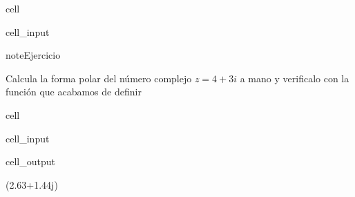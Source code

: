 \documentclass[letterpaper,10pt,english]{jupyterBook}
\begin{document}
\begin{sphinxuseclass}{cell}
\begin{sphinxVerbatimInput}
\begin{sphinxuseclass}{cell_input}
\begin{sphinxVerbatim}[commandchars=\\\{\}]
     

\end{sphinxVerbatim}

\end{sphinxuseclass}\end{sphinxVerbatimInput}

\end{sphinxuseclass}
\begin{sphinxadmonition}{note}{Ejercicio}

\sphinxAtStartPar
Calcula  la forma polar del número complejo \(z = 4 + 3 i\) a mano y verificalo con la función que acabamos de definir
\end{sphinxadmonition}

\begin{sphinxuseclass}{cell}\begin{sphinxVerbatimInput}

\begin{sphinxuseclass}{cell_input}
\begin{sphinxVerbatim}[commandchars=\\\{\}]
  
\end{sphinxVerbatim}

\end{sphinxuseclass}\end{sphinxVerbatimInput}
\begin{sphinxVerbatimOutput}

\begin{sphinxuseclass}{cell_output}
\begin{sphinxVerbatim}[commandchars=\\\{\}]
(2.63+1.44j)
\end{sphinxVerbatim}

\end{sphinxuseclass}\end{sphinxVerbatimOutput}

\end{sphinxuseclass}
\end{document}
